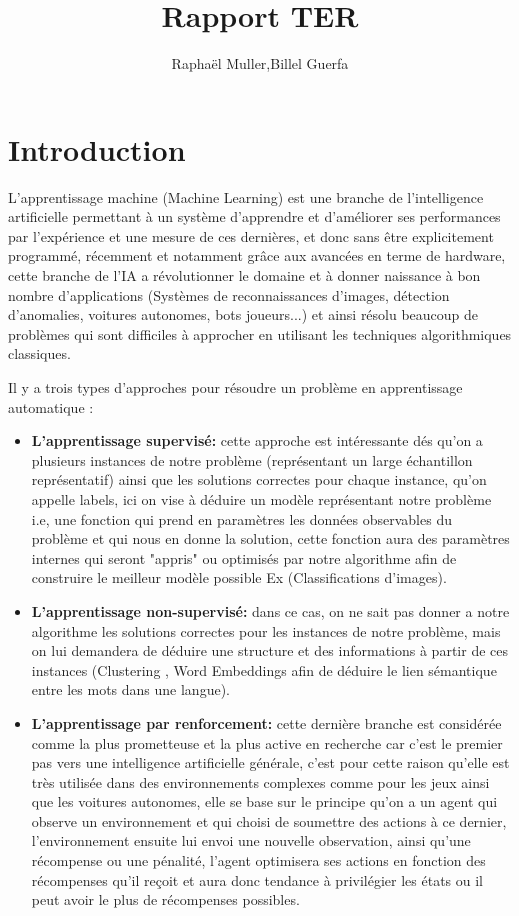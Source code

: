 \documentclass[a4paper,10pt]{article}
\begin{document}
\title{Rapport TER}
\author{Raphaël Muller,Billel Guerfa}
\maketitle

\part{Introduction}
\par
L'apprentissage machine (Machine Learning) est une branche de l'intelligence artificielle permettant à un système d'apprendre et d'améliorer ses performances par l'expérience et une mesure de ces dernières, et donc sans être explicitement programmé, récemment et notamment grâce aux avancées en terme de hardware, cette branche de l'IA a révolutionner le domaine et à donner naissance à bon nombre d'applications (Systèmes de reconnaissances d'images, détection d'anomalies, voitures autonomes, bots joueurs...) et ainsi résolu beaucoup de problèmes qui sont difficiles à approcher en utilisant les techniques algorithmiques classiques.
\par
Il y a trois types d'approches pour résoudre un problème en apprentissage automatique :
\begin{itemize}
\item  \textbf{L'apprentissage supervisé:} cette approche est intéressante dés qu'on a plusieurs instances de notre problème (représentant un large échantillon représentatif) ainsi que les solutions correctes pour chaque instance, qu'on appelle labels, ici on vise à déduire un modèle représentant notre problème i.e, une fonction qui prend en paramètres les données observables du problème et qui nous en donne la solution, cette fonction aura des paramètres internes qui seront "appris" ou optimisés par notre algorithme afin de construire le meilleur modèle possible Ex (Classifications d'images).
    
\item \textbf{L'apprentissage non-supervisé:} dans ce cas, on ne sait pas donner a notre algorithme les solutions correctes pour les instances de notre problème, mais on lui demandera de déduire une structure et des informations à partir de ces instances (Clustering , Word Embeddings afin de déduire le lien sémantique entre les mots dans une langue).

\item \textbf{L'apprentissage par renforcement:} cette dernière branche est considérée comme la plus prometteuse et la plus active en recherche car c'est le premier pas vers une intelligence artificielle générale, c'est pour cette raison qu'elle est très utilisée dans des environnements complexes comme pour les jeux ainsi que les voitures autonomes, elle se base sur le principe qu'on a un agent qui observe un environnement et qui choisi de soumettre des actions à ce dernier, l'environnement ensuite lui envoi une nouvelle observation, ainsi qu'une récompense ou une pénalité, l'agent optimisera ses actions en fonction des récompenses qu'il reçoit et aura donc tendance à privilégier les états ou il peut avoir le plus de récompenses possibles.
\end{itemize}
     
\end{document}
